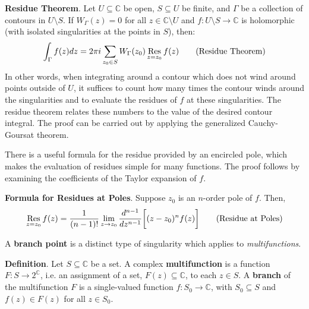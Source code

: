 \textbf{Residue Theorem}. Let $U\subseteq\mathbb{C}$ be open, $S\subseteq U$ be finite, and $\Gamma$ be a collection of contours in $U\setminus S$. If $W_\Gamma (z) = 0$ for all $z\in\mathbb{C}\setminus U$ and $f:U\setminus S \to \mathbb{C}$ is holomorphic (with isolated singularities at the points in $S$), then: \[\int_\Gamma f(z)dz = 2\pi i \sum_{z_0\in S} W_\Gamma (z_0) \mathop{\mathrm{Res}}_{z=z_0} f(z)\tag{Residue Theorem}\] In other words, when integrating around a contour which does not wind around points outside of $U$, it suffices to count how many times the contour winds around the singularities and to evaluate the residues of $f$ at these singularities. The residue theorem relates these numbers to the value of the desired contour integral. The proof can be carried out by applying the generalized Cauchy-Goursat theorem.

There is a useful formula for the residue provided by an encircled pole, which makes the evaluation of residues simple for many functions. The proof follows by examining the coefficients of the Taylor expansion of $f$.

\textbf{Formula for Residues at Poles}. Suppose $z_0$ is an $n$-order pole of $f$. Then, \[\mathop{\mathrm{Res}}_{z=z_0} f(z) = \frac{1}{(n-1)!} \lim_{z\to z_0} \frac{d^{n-1}}{dz^{n-1}} \bigg[(z-z_0)^nf(z)\bigg]\tag{Residue at Poles}\]

A \textbf{branch point} is a distinct type of singularity which applies to \textit{multifunctions}.

\textbf{Definition}. Let $S\subseteq\mathbb{C}$ be a set. A complex \textbf{multifunction} is a function $F:S\to2^{\mathbb{C}}$, i.e. an assignment of a set, $F(z)\subseteq\mathbb{C}$, to each $z\in S$. A \textbf{branch} of the multifunction $F$ is a single-valued function $f:S_0\to \mathbb{C}$, with $S_0\subseteq S$ and $f(z)\in F(z)$ for all $z\in S_0$.

